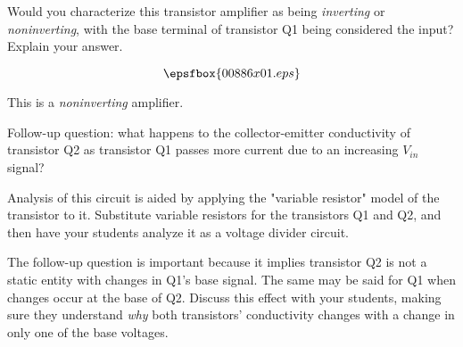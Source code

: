 

Would you characterize this transistor amplifier as being {\it inverting} or {\it noninverting}, with the base terminal of transistor Q1 being considered the input?  Explain your answer.

$$\epsfbox{00886x01.eps}$$







This is a {\it noninverting} amplifier.

\vskip 10pt

Follow-up question: what happens to the collector-emitter conductivity of transistor Q2 as transistor Q1 passes more current due to an increasing $V_{in}$ signal?







Analysis of this circuit is aided by applying the "variable resistor" model of the transistor to it.  Substitute variable resistors for the transistors Q1 and Q2, and then have your students analyze it as a voltage divider circuit.

The follow-up question is important because it implies transistor Q2 is not a static entity with changes in Q1's base signal.  The same may be said for Q1 when changes occur at the base of Q2.  Discuss this effect with your students, making sure they understand {\it why} both transistors' conductivity changes with a change in only one of the base voltages.




